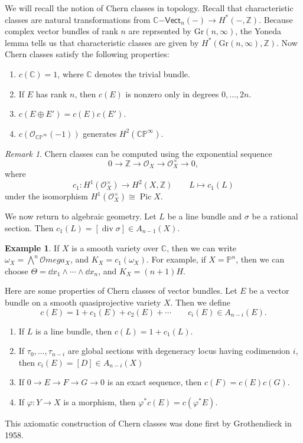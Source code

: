 \documentclass[leqno, openany]{memoir}
\theoremstyle{definition}
\newtheorem{exm}[thm]{Example}
\theoremstyle{remark}
\newtheorem{rmk}[thm]{Remark}
\theoremstyle{plain}
\theoremstyle{definition}
\theoremstyle{remark}
\newcommand{\C}{\mathbb{C}}
\newcommand{\Z}{\mathbb{Z}}
\renewcommand{\P}{\mathbb{P}}
\newcommand{\mc}[1]{\mathcal{#1}}
\newcommand{\mr}[1]{\mathrm{#1}}
\newcommand{\ms}[1]{\mathsf{#1}}
\renewcommand{\div}{\operatorname{div}}
\DeclareMathOperator{\Pic}{Pic}
\begin{document}
We will recall the notion of Chern classes in topology. Recall that
characteristic classes are natural transformations from $\C\ms{-Vect}_n(-) \to
H^*(-, \Z)$. Because complex vector bundles of rank $n$ are reprsented by
$\mr{Gr}(n, \infty)$, the Yoneda lemma tells us that characteristic classes are
given by $H^*(\mr{Gr}(n, \infty), \Z)$. Now Chern classes satisfy the following
properties: \begin{enumerate} \item $c(\C) = 1$, where $\C$ denotes the trivial
    bundle.  \item If $E$ has rank $n$, then $c(E)$ is nonzero only in degrees
    $0, \ldots, 2n$.  \item $c(E \oplus E') = c(E) c(E')$.  \item
    $c(\mc{O}_{\C\P^{\infty}}(-1))$ generates $H^2(\C\P^{\infty})$.
    \end{enumerate}

\begin{rmk} Chern classes can be computed using the exponential sequence \[ 0
    \to \Z \to \mc{O}_X \to \mc{O}_X^{\times} \to 0, \] where \[ c_1 \colon
H^1(\mc{O}_X^{\times}) \to H^2(X, \Z) \qquad L \mapsto c_1(L) \] under the
isomorphism $H^1(\mc{O}_X^{\times}) \cong \Pic X$.  \end{rmk}

We now return to algebraic geometry. Let $L$ be a line bundle and $\sigma$ be a
rational section. Then $c_1(L) = [\div \sigma] \in A_{n-1}(X)$.

\begin{exm} If $X$ is a smooth variety over $\C$, then we can write $\omega_X =
    \bigwedge^n \mc{O}mega_X$, and $K_X = c_1(\omega_X)$. For example, if $X =
    \P^n$, then we can choose $\Theta = \dd{x_1} \wedge \cdots \wedge
    \dd{x_n}$, and $K_X = (n+1)H$.  \end{exm}

Here are some properties of Chern classes of vector bundles. Let $E$ be a
vector bundle on a smooth quasiprojective variety $X$. Then we define \[ c(E) =
    1 + c_1(E) + c_2(E) + \cdots \qquad c_i(E) \in A_{n-i}(E). \]
    \begin{enumerate} \item If $L$ is a line bundle, then $c(L) = 1 + c_1(L)$.
        \item If $\tau_0, \ldots, \tau_{n-i}$ are global sections with
            degeneracy locus having codimension $i$, then $c_i(E) = [D] \in
            A_{n-i}(X)$ \item If $0 \to E \to F \to G \to 0$ is an exact
            sequence, then $c(F) = c(E) c(G)$.  \item If $\varphi \colon Y \to
    X$ is a morphism, then $\varphi^* c(E) = c(\varphi^* E)$.  \end{enumerate}
    This axiomatic construction of Chern classes was done first by Grothendieck
    in 1958.
\end{document}
